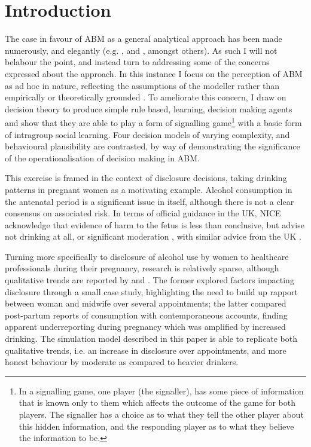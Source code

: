 \section{Introduction}
\label{sec:intro}

The case in favour of \ac{ABM} as a general analytical approach has been made numerously, and elegantly (e.g. \cite{epstein1994growing,Resnick,Axelrod1997,gilbert1999simulation,Macy2002a,Silverman2011,Silverman2013}, and \cite{epstein2014agent_zero}, amongst others). As such I will not belabour the point, and instead turn to addressing some of the concerns expressed about the approach. In this instance I focus on the perception of \ac{ABM} as ad hoc in nature, reflecting the assumptions of the modeller rather than empirically or theoretically grounded \citep{Waldherr2013}. To ameliorate this concern, I draw on decision theory to produce simple rule based, learning, decision making agents and show that they are able to play a form of signalling game\footnote{In a signalling game, one player (the signaller), has some piece of information that is known only to them which affects the outcome of the game for both players. The signaller has a choice as to what they tell the other player about this hidden information, and the responding player as to what they believe the information to be.} \citep{Kreps1987} with a basic form of intragroup social learning. Four decision models of varying complexity, and behavioural plausibility are contrasted, by way of demonstrating the significance of the operationalisation of decision making in \ac{ABM}.

This exercise is framed in the context of disclosure decisions, taking drinking patterns in pregnant women as a motivating example. Alcohol consumption in the antenatal period is a significant issue in itself, although there is not a clear consensus on associated risk. In terms of official guidance in the UK, \ac{NICE} acknowledge that evidence of harm to the fetus is less than conclusive, but advise not drinking at all, or significant moderation \citep{NICE2010a}, with similar advice from the UK \cite{DepartmentofHealth2008}.

Turning more specifically to disclosure of alcohol use by women to healthcare professionals during their pregnancy, research is relatively sparse, although qualitative trends are reported by \citet{Phillips2007} and \citet{Alvik2006}. The former explored factors impacting disclosure through a small case study, highlighting the need to build up rapport between woman and midwife over several appointments; the latter compared post-partum reports of consumption with contemporaneous accounts, finding apparent underreporting during pregnancy which was amplified by increased drinking. The simulation model described in this paper is able to replicate both qualitative trends, i.e. an increase in disclosure over appointments, and more honest behaviour by moderate as compared to heavier drinkers.

